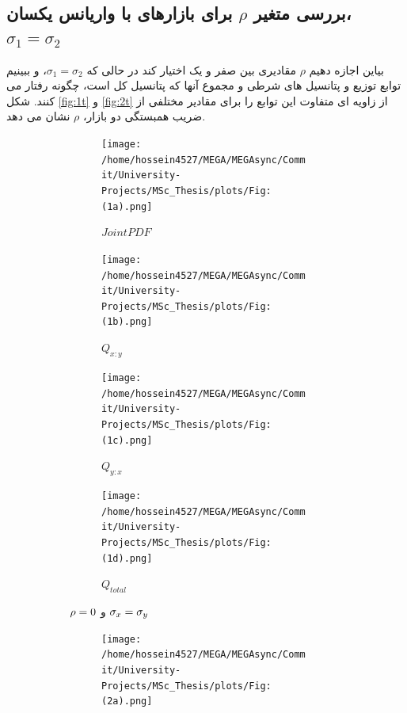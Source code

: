 \documentclass[a4paper,titlepage,12pt,fleqn,oneside]{report}
\begin{document}
	\subsection{
		بررسی متغیر 
		$\rho$
		برای بازارهای با واریانس یکسان،
		$\sigma_1 = \sigma_2$
	}
	بیاین اجازه دهیم 
	$\rho$
	مقادیری بین صفر و یک اختیار کند در حالی که 
	$\sigma_1 = \sigma_2$،
	و ببینیم توابع توزیع و پتانسیل های شرطی و مجموع آنها که پتانسیل کل است، چگونه رفتار می کنند. شکل 
	\ref{fig:1t}
	و 
	\ref{fig:2t}
	از زاویه ای متفاوت این توابع را برای مقادیر مختلفی از ضریب همبستگی دو بازار،
	$\rho$
	نشان می دهد. 
	\begin{figure}[tbp]
		\centering
		\begin{subfigure}[b]{\textwidth}
			\renewcommand\thesubfigure{a}
			\begin{subfigure}[b]{0.24\textwidth}
				\renewcommand\thesubfigure{i}
				\centering
				\texttt{[image: /home/hossein4527/MEGA/MEGAsync/Commit/University-Projects/MSc\_Thesis/plots/Fig:(1a).png]}
				\caption{$Joint PDF$}
				\label{fig:1.1.1}
			\end{subfigure}
			\hfill
			\begin{subfigure}[b]{0.24\textwidth}
				\renewcommand\thesubfigure{ii}
				\centering
				\texttt{[image: /home/hossein4527/MEGA/MEGAsync/Commit/University-Projects/MSc\_Thesis/plots/Fig:(1b).png]}
				\caption{$Q_{x:y}$}
				\label{fig:1.1.2}
			\end{subfigure}
			\hfill
			\begin{subfigure}[b]{0.24\textwidth}
				\renewcommand\thesubfigure{iii}
				\centering
				\texttt{[image: /home/hossein4527/MEGA/MEGAsync/Commit/University-Projects/MSc\_Thesis/plots/Fig:(1c).png]}
				\caption{$Q_{y:x}$}
				\label{fig:1.1.3}
			\end{subfigure}
			\hfill
			\begin{subfigure}[b]{0.24\textwidth}
				\renewcommand\thesubfigure{iv}
				\centering
				\texttt{[image: /home/hossein4527/MEGA/MEGAsync/Commit/University-Projects/MSc\_Thesis/plots/Fig:(1d).png]}
				\caption{$Q_{total}$}
				\label{fig:1.1.4}
			\end{subfigure}
			\caption{$\protect\rho =0$ و $\protect\sigma _{x}=\protect\sigma _{y}$}
			\label{fig:1.1}
		\end{subfigure}
		\begin{subfigure}[b]{\textwidth}
			\renewcommand\thesubfigure{b}
			\begin{subfigure}[b]{0.24\textwidth}
				\renewcommand\thesubfigure{i}
				\centering
				\texttt{[image: /home/hossein4527/MEGA/MEGAsync/Commit/University-Projects/MSc\_Thesis/plots/Fig:(2a).png]}

\end{subfigure}
\end{subfigure}
\end{figure}
\end{document}
